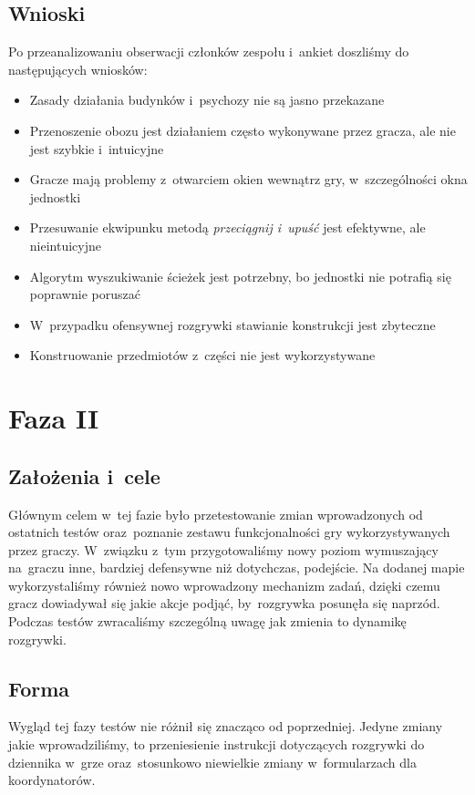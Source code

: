 \documentclass[licencjacka]{pracamgr}
\begin{document}
    \subsection{Wnioski}
      Po przeanalizowaniu obserwacji członków zespołu i~ankiet doszliśmy do następujących wniosków:
      \begin{itemize}
	\item Zasady działania budynków i~psychozy nie są jasno przekazane
	\item Przenoszenie obozu jest działaniem często wykonywane przez gracza, ale nie jest szybkie i~intuicyjne
	\item Gracze mają problemy z~otwarciem okien wewnątrz gry, w~szczególności okna jednostki
	\item Przesuwanie ekwipunku metodą \emph{przeciągnij i~upuść} jest efektywne, ale nieintuicyjne
	\item Algorytm wyszukiwanie ścieżek jest potrzebny, bo jednostki nie potrafią się poprawnie poruszać
	\item W~przypadku ofensywnej rozgrywki stawianie konstrukcji jest zbyteczne
	\item Konstruowanie przedmiotów z~części nie jest wykorzystywane
      \end{itemize}

  \section{Faza II}

    \subsection{Założenia i~cele}
      Głównym celem w~tej fazie było przetestowanie zmian wprowadzonych od ostatnich testów oraz~poznanie zestawu funkcjonalności gry
      wykorzystywanych przez graczy. W~związku z~tym przygotowaliśmy nowy poziom wymuszający na~graczu inne, bardziej defensywne
      niż dotychczas, podejście. Na dodanej mapie wykorzystaliśmy również nowo wprowadzony mechanizm zadań, dzięki czemu gracz
      dowiadywał się jakie akcje podjąć, by~rozgrywka posunęła się naprzód. Podczas testów zwracaliśmy szczególną uwagę jak zmienia
      to dynamikę rozgrywki.

    \subsection{Forma}
      Wygląd tej fazy testów nie różnił się znacząco od poprzedniej. Jedyne zmiany jakie wprowadziliśmy,
      to przeniesienie instrukcji dotyczących rozgrywki do dziennika w~grze oraz~stosunkowo niewielkie zmiany
      w~formularzach dla koordynatorów.
\end{document}
